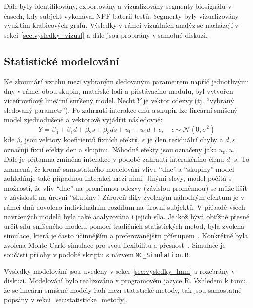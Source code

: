 Dále byly identifikovány, exportovány a vizualizovány segmenty biosignálů v
časech, kdy subjekt vykonával \gls{NPF} baterii testů. Segmenty byly
vizualizovány využitím krabicových grafů. Výsledky v rámci vizuálních analýz se
nacházejí v sekci~\ref{sec:vysledky_vizual} a dále jsou probírány v samotné
diskuzi.

\subsection{Statistické modelování}
\label{subsec:tvorba_modelů}
Ke zkoumání vztahu mezi vybraným sledovaným parametrem napříč jednotlivými dny v
rámci obou skupin, mateřské lodi a přistávacího modulu, byl vytvořen
víceúrovňový lineární smíšený model. Nechť $Y$ je vektor odezvy (tj.
\enquote{vybraný sledovaný parametr}). Po zahrnutí interakce dnů a skupin lze
lineární smíšený model zjednodušeně a vektorově vyjádřit následovně:
\begin{equation}
      Y = \beta_{0}+\beta_{1} {d}+\beta_{2} {s}+\beta_{3} {d} {s} + u_{0} + u_{1}d + \epsilon, \quad \epsilon \sim \mathcal{N}\left(0, \sigma^2\right)
\end{equation}
kde $\beta_i$ jsou vektory koeficientů fixních efektů, $\epsilon$ je člen
reziduální chyby a $d, s$ označují fixní efekty den a skupinu. Náhodné efekty
jsou označeny jako $u_0, u_1$. Dále je přítomna zmíněna interakce v podobě
zahrnutí interakčního členu $d \cdot s$. To znamená, že kromě samostatného
modelování vlivu \enquote{dne} a \enquote{skupiny} model zohledňuje také
případnou interakci mezi nimi. Jinými slovy, model počítá s možností, že vliv
\enquote{dne} na proměnnou odezvy (závislou proměnnou) se může lišit v
závislosti na úrovni \enquote{skupiny}. Zároveň díky zvoleným náhodným efektům
je v rámci dnů dovoleno individuálním rozdílům na úrovni subjektů. V případě
všech navržených modelů byla také analyzována i jejich síla. Jelikož bývá
obtížné přesně určit sílu smíšeného modelu pomocí tradičních statistických
metod, byla zvolena simulace, která je často účinnějším a preferovanějším
přístupem~\cite{Green2016}. Konkrétně byla zvolena Monte Carlo simulace pro svou
flexibilitu a přesnost~\cite{Bolker2008,Johnson2015}. Simulace je součástí
přílohy v podobě skriptu s názvem \texttt{MC\_Simulation.R}.

Výsledky modelování jsou uvedeny v sekci~\ref{sec:vysledky_lmm} a rozebrány v
diskuzi. Modelování bylo realizováno v programovém jazyce R. Vzhledem k tomu, že
se lineární smíšené modely řadí mezi statistické metody, tak jsou samostatně
popsány v sekci~\ref{sec:statisticke_metody}.